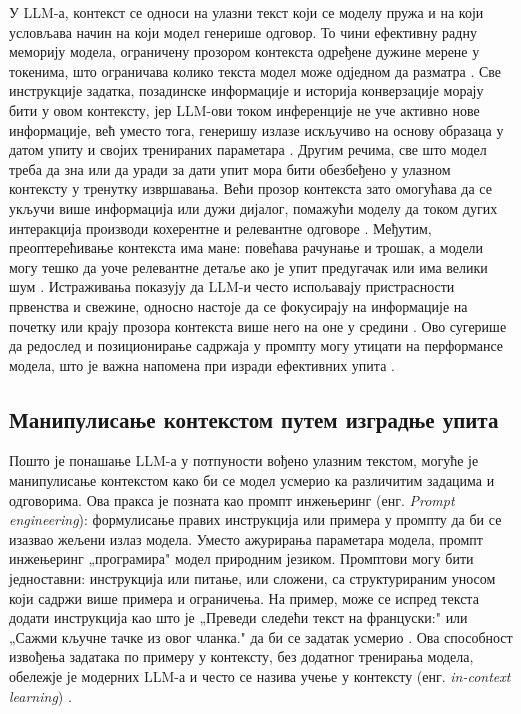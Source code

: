 У LLM-а, контекст се односи на улазни текст који се моделу пружа и на који условљава начин на који модел генерише одговор. То чини ефективну радну меморију модела, ограничену прозором контекста одређене дужине мерене у токенима, што ограничава колико текста модел може одједном да разматра \cite{martineau_whats_2024}. Све инструкције задатка, позадинске информације и историја конверзације морају бити у овом контексту, јер LLM-ови током инференције не уче активно нове информације, већ уместо тога, генеришу излазе искључиво на основу образаца у датом упиту и својих тренираних параметара \cite{martineau_whats_2024}. Другим речима, све што модел треба да зна или да уради за дати упит мора бити обезбеђено у улазном контексту у тренутку извршавања. Већи прозор контекста зато омогућава да се укључи више информација или дужи дијалог, помажући моделу да током дугих интеракција производи кохерентне и релевантне одговоре \cite{martineau_whats_2024}. Међутим, преоптерећивање контекста има мане: повећава рачунање и трошак, а модели могу тешко да уоче релевантне детаље ако је упит предугачак или има велики шум \cite{liu_lost_2023}. Истраживања показују да LLM-и често испољавају пристрасности првенства и свежине, односно настоје да се фокусирају на информације на почетку или крају прозора контекста више него на оне у средини \cite{liu_lost_2023}. Ово сугерише да редослед и позиционирање садржаја у промпту могу утицати на перформансе модела, што је важна напомена при изради ефективних упита \cite{liu_lost_2023}.

\subsection{Манипулисање контекстом путем изградње упита}

Пошто је понашање LLM-а у потпуности вођено улазним текстом, могуће је манипулисање контекстом како би се модел усмерио ка различитим задацима и одговорима. Ова пракса је позната као промпт инжењеринг (енг. \textit{Prompt engineering}): формулисање правих инструкција или примера у промпту да би се изазвао жељени излаз модела. Уместо ажурирања параметара модела, промпт инжењеринг „програмира" модел природним језиком. Промптови могу бити једноставни: инструкција или питање, или сложени, са структурираним уносом који садржи више примера и ограничења. На пример, може се испред текста додати инструкција као што је „Преведи следећи текст на француски:" или „Сажми кључне тачке из овог чланка." да би се задатак усмерио \cite{sahoo_systematic_2025}. Ова способност извођења задатака по примеру у контексту, без додатног тренирања модела, обележје је модерних LLM-а и често се назива учење у контексту (енг. \textit{in-context learning}) \cite{sahoo_systematic_2025}.


